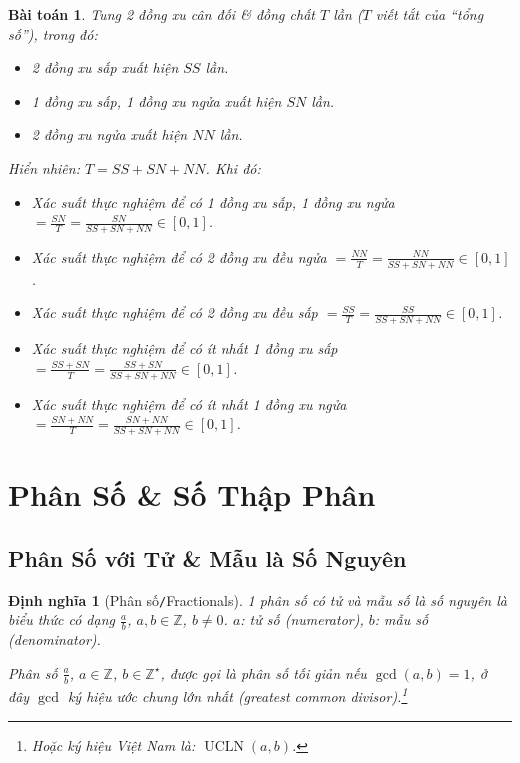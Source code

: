 \documentclass{article}
\numberwithin{equation}{section}
\newtheorem{definition}{Định nghĩa}[section]
\newtheorem{problem}{Bài toán}[section]
\begin{document}
\begin{problem}
	Tung 2 đồng xu cân đối \& đồng chất $T$ lần ($T$ viết tắt của ``tổng số''), trong đó:
	\begin{itemize}
		\item 2 đồng xu sấp xuất hiện $SS$ lần.
		\item 1 đồng xu sấp, 1 đồng xu ngửa xuất hiện $SN$ lần.
		\item 2 đồng xu ngửa xuất hiện $NN$ lần.
	\end{itemize}
	Hiển nhiên: $T = SS + SN + NN$. Khi đó:
	\begin{itemize}
		\item Xác suất thực nghiệm để có 1 đồng xu sấp, 1 đồng xu ngửa $= \frac{SN}{T} = \frac{SN}{SS + SN + NN}\in[0,1]$.
		\item Xác suất thực nghiệm để có 2 đồng xu đều ngửa $= \frac{NN}{T} = \frac{NN}{SS + SN + NN}\in[0,1]$.
		\item Xác suất thực nghiệm để có 2 đồng xu đều sấp $= \frac{SS}{T} = \frac{SS}{SS + SN + NN}\in[0,1]$.
		\item Xác suất thực nghiệm để có ít nhất 1 đồng xu sấp $= \frac{SS + SN}{T} = \frac{SS + SN}{SS + SN + NN}\in[0,1]$.
		\item Xác suất thực nghiệm để có ít nhất 1 đồng xu ngửa $= \frac{SN + NN}{T} = \frac{SN + NN}{SS + SN + NN}\in[0,1]$.
	\end{itemize}
\end{problem}

\section{Phân Số \& Số Thập Phân}

\subsection{Phân Số với Tử \& Mẫu là Số Nguyên}
\begin{definition}[Phân số\texttt{/}Fractionals]
	1 \emph{phân số} có tử và mẫu số là số nguyên là biểu thức có dạng $\frac{a}{b}$, $a,b\in\mathbb{Z}$, $b\ne 0$. $a$: tử số (numerator), $b$: mẫu số (denominator).
	
	Phân số $\frac{a}{b}$, $a\in\mathbb{Z}$, $b\in\mathbb{Z}^\star$, được gọi là \emph{phân số tối giản} nếu $\operatorname{gcd}(a,b) = 1$, ở đây $\operatorname{gcd}$ ký hiệu \emph{ước chung lớn nhất} (greatest common divisor).\footnote{Hoặc ký hiệu Việt Nam là: $\operatorname{UCLN}(a,b)$.}
\end{definition}
\end{document}
